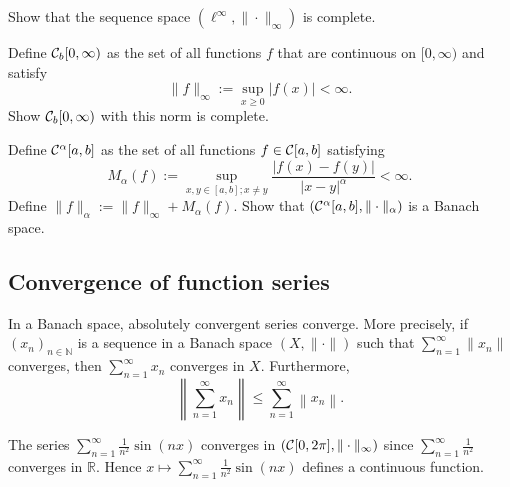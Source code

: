 \begin{exc}
  \label{exc:ellInftyComplete}
  Show that the sequence space
  $(\ell^{\infty}, \|\cdot\|_{\infty})$ is complete.
\end{exc}

\begin{exc}
  Define ${\cal C}_b[0,\infty)$ as the set of all functions
  $f$ that are continuous on $[0,\infty)$
  and satisfy
  \begin{displaymath}
    \|f\|_{\infty} := \sup_{x\ge 0}|f(x)| < \infty.
  \end{displaymath}
  Show ${\cal C}_b[0,\infty)$ with this norm is complete.
\end{exc}

\begin{exc}
  Define ${\cal C}^{\alpha}[a,b]$ as the set of all functions
  $f\in {\cal C}[a,b]$ satisfying
  \begin{displaymath}
    M_{\alpha}(f) := \sup_{x,y\in[a,b]; x\ne y}
    \frac{|f(x)-f(y)|}{|x-y|^{\alpha}} < \infty.
  \end{displaymath}
  Define $\|f\|_{\alpha} := \|f\|_{\infty}+M_{\alpha}(f)$.
  Show that $({\cal C}^{\alpha}[a,b], \|\cdot\|_{\alpha})$
  is a Banach space.
\end{exc}

\subsection{Convergence of function series}

\begin{thm}
  \label{thm:absolutelyConvergentSeriesConvergeInBanach}
  In a Banach space, absolutely convergent series converge.
  More precisely,
  if $(x_n)_{n\in \mathbb{N}}$ is a sequence
  in a Banach space $(X, \|\cdot\|)$
  such that $\sum_{n=1}^{\infty} \|x_n\|$ converges,
  then $\sum_{n=1}^{\infty} x_n$ converges in $X$.
  Furthermore,
  \begin{equation}
    \label{eq:triangleInequalityInfty}
    \left\|\sum_{n=1}^{\infty}x_n\right\|
    \le \sum_{n=1}^{\infty} \left\|x_n\right\|.
  \end{equation}
\end{thm}

\begin{exm}
  The series $\sum_{n=1}^{\infty}\frac{1}{n^2}\sin(nx)$
  converges in $({\cal C}[0,2 \pi], \|\cdot\|_{\infty})$
  since $\sum_{n=1}^{\infty}\frac{1}{n^2}$ converges in $\mathbb{R}$.
  Hence $x\mapsto \sum_{n=1}^{\infty}\frac{1}{n^2}\sin(nx)$
  defines a continuous function. 
\end{exm}

